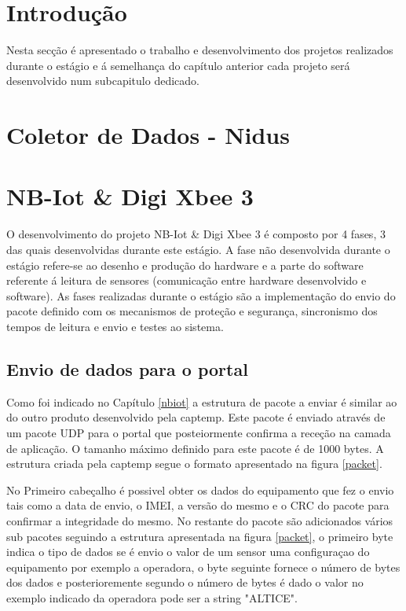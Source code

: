 \section{Introdução}
Nesta secção é apresentado o trabalho e desenvolvimento dos projetos realizados durante o estágio e á semelhança do capítulo anterior cada projeto será desenvolvido num subcapitulo dedicado.

\section{Coletor de Dados - Nidus} 
\par



\section {NB-Iot \& Digi Xbee 3 }
\par
O desenvolvimento do projeto NB-Iot \& Digi Xbee 3  é composto por 4 fases, 3 das quais desenvolvidas durante este estágio. A fase não desenvolvida durante o estágio refere-se ao desenho e produção do hardware e a parte do software referente á leitura de sensores (comunicação entre hardware desenvolvido e software). As fases realizadas durante o estágio são a implementação do envio do pacote definido com os mecanismos de proteção e segurança, sincronismo dos tempos de leitura e envio e testes ao sistema.

\subsection {Envio de dados para o portal}

\par Como foi indicado no Capítulo \ref{nbiot} a estrutura de pacote a enviar é similar ao do outro produto desenvolvido pela captemp. Este pacote é enviado através de um pacote UDP para o portal que posteiormente confirma a receção na camada de aplicação. O tamanho máximo definido para este pacote é de 1000 bytes.
A estrutura criada pela captemp segue o formato apresentado na figura \ref{packet}.
\par No Primeiro cabeçalho é possivel obter os dados do equipamento que fez o envio tais como a data de envio, o IMEI, a versão do mesmo e o CRC do pacote para confirmar a integridade do mesmo. No restante do pacote são adicionados vários sub pacotes seguindo a estrutura apresentada na figura \ref {packet}, o primeiro byte indica o tipo de dados se é envio o valor de um sensor uma configuraçao do equipamento por exemplo a operadora, o byte seguinte fornece o número de bytes dos dados e posterioremente segundo o número de bytes é dado o valor no exemplo indicado da operadora pode ser a string "ALTICE".

